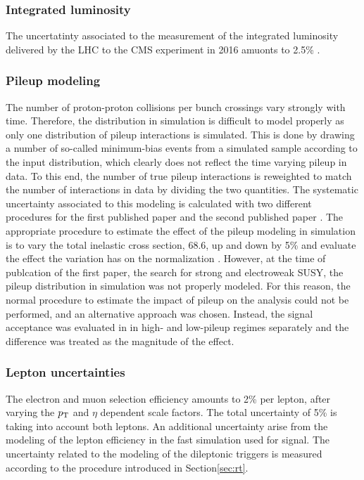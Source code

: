 \subsubsection*{Integrated luminosity} 
\noindent\justify
The uncertatinty associated to the measurement of the integrated luminosity delivered by the LHC to the CMS experiment in 2016 amuonts to 2.5\% \cite{CMS-PAS-LUM-17-001}.
\subsubsection*{Pileup modeling}
\noindent\justify
The number of proton-proton collisions per bunch crossings vary strongly with time. 
Therefore, the distribution in simulation is difficult to model properly as only one distribution of pileup interactions is simulated. 
This is done by drawing a number of so-called minimum-bias events from a simulated sample according to the input distribution, which clearly does not reflect the time varying pileup in data. 
To this end, the number of true pileup interactions is reweighted to match the number of interactions in data by dividing the two quantities.
The systematic uncertainty associated to this modeling is calculated with two different procedures for the first published paper \cite{Sirunyan:2017qaj} and the second published paper \cite{Sirunyan:2018nwe}. 
The appropriate procedure to estimate the effect of the pileup modeling in simulation is to vary the total inelastic cross section, 68.6\mb, up and down by 5\% and evaluate the effect the variation has on the normalization \cite{Sirunyan:2018nqx}. 
However, at the time of publcation of the first paper, the search for strong and electroweak SUSY, the pileup distribution in simulation was not properly modeled. 
For this reason, the normal procedure to estimate the impact of pileup on the analysis could not be performed, and an alternative approach was chosen. 
Instead, the signal acceptance was evaluated in in high- and low-pileup regimes separately and the difference was treated as the magnitude of the effect.
\subsubsection*{Lepton uncertainties} 
\noindent\justify
The electron and muon selection efficiency amounts to 2\% per lepton, after varying the $p_{\mathrm{T}}$ and $\eta$ dependent scale factors. 
The total uncertainty of 5\% is taking into account both leptons. An additional uncertainty arise from the modeling of the lepton efficiency in the fast simulation used for signal. 
The uncertainty related to the modeling of the dileptonic triggers is measured according to the procedure introduced in Section\ref{sec:rt}. 
